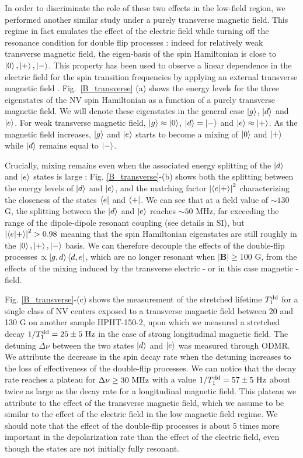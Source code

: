 \documentclass[preprintnumbers,amsmath,amssymb,superscriptaddress,twocolumn,showpacs]{revtex4-2}
\begin{document}
In order to discriminate the role of these two effects in the low-field region, we performed another similar study under a purely transverse magnetic field.
This regime in fact emulates the effect of the electric field while turning off the resonance condition for double flip processes : indeed for relatively weak transverse magnetic field, the eigen-basis of the spin Hamiltonian is close to $\ket{0},\ket{+},\ket{-}$. This property has been used to observe a linear dependence in the electric field for the spin transition frequencies by applying an external transverse magnetic field \cite{dolde2011electric,qiu2022nanoscale}.
Fig.~\ref{B_transverse} (a) shows the energy levels for the three eigenstates of the NV spin Hamiltonian as a function of a purely transverse magnetic field. We will denote these eigenstates in the general case $\ket{g}$, $\ket{d}$ and $\ket{e}$. For weak transverse magnetic field, $\ket{g} \approx \ket{0}$, $\ket{d}=\ket{-}$ and $\ket{e} \approx \ket{+}$. As the magnetic field increases, $\ket{g}$ and $\ket{e}$ starts to become a mixing of $\ket{0}$ and $\ket{+}$ while $\ket{d}$ remains equal to $\ket{-}$.

Crucially, mixing remains even when the associated energy splitting of the $\ket{d}$ and $\ket{e}$ states is large : Fig. \ref{B_transverse}-(b) shows both the splitting between the energy levels of $\ket{d}$ and $\ket{e}$, and the matching factor $\abs{\bra{e}\ket{+}}^2$ characterizing the closeness of the states $\bra{e}$ and $\bra{+}$. We can see that at a field value of $\sim 130$ G, the splitting between the $\ket{d}$ and $\ket{e}$ reaches $\sim 50$ MHz, far exceeding the range of the dipole-dipole resonant coupling (see details in SI), but $\abs{\bra{e}\ket{+}}^2 > 0.98$ meaning that the spin Hamiltonian eigenstates are still roughly in the $\ket{0}, \ket{+}, \ket{-}$ basis. We can therefore decouple the effects of the double-flip processes  $\propto \ket{g,d}\bra{d,e}$, which are no longer resonant when $| \bm B | \geq 100$ G, from the effects of the mixing induced by the transverse electric - or in this case magnetic - field.

Fig. \ref{B_transverse}-(c) shows the measurement of the stretched lifetime $T_1^{\rm dd}$ for a single class of NV centers exposed to a transverse magnetic field between 20 and 130 G on another sample HPHT-150-2, upon which we measured a stretched decay $1/T_1^{\rm dd}=25\pm 5\  \rm Hz$ in the case of strong longitudinal magnetic field. The detuning $\Delta \nu$ between the two states $\ket{d}$ and $\ket{e}$ was measured through ODMR. We attribute the decrease in the spin decay rate when the detuning increases to the loss of effectiveness of the double-flip processes. We can notice that the decay rate reaches a plateau for $\Delta \nu \geq 30\ \rm MHz$ with a value $1/T_1^{\rm dd}=57\pm 5\  \rm Hz$ about twice as large as the decay rate for a longitudinal magnetic field. This plateau we attribute to the effect of the transverse magnetic field, which we assume to be similar to the effect of the electric field in the low magnetic field regime. We should note that the effect of the double-flip processes is about 5 times more important in the depolarization rate than the effect of the electric field, even though the states are not initially fully resonant.
\end{document}

